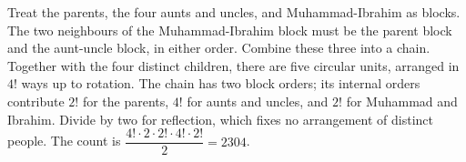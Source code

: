 Treat the parents, the four aunts and uncles, and Muhammad-Ibrahim as blocks. The two neighbours of the Muhammad-Ibrahim block must be the parent block and the aunt-uncle block, in either order. Combine these three into a chain. Together with the four distinct children, there are five circular units, arranged in $4!$ ways up to rotation. The chain has two block orders; its internal orders contribute $2!$ for the parents, $4!$ for aunts and uncles, and $2!$ for Muhammad and Ibrahim. Divide by two for reflection, which fixes no arrangement of distinct people. The count is $\dfrac{4!\cdot2\cdot2!\cdot4!\cdot2!}{2}=\boxed{2304}$.
